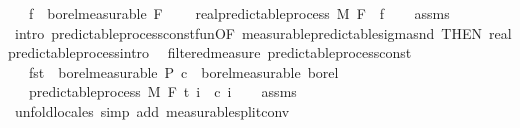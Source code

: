 \begin{isabellebody}
\ \ \ {\isachardoublequoteopen}f\ {\isasymin}\ borel{\isacharunderscore}{\kern0pt}measurable\ {\isacharparenleft}{\kern0pt}F\ {}{\isacharparenright}{\kern0pt}{\isachardoublequoteclose}\isanewline
\ \ \ {\isachardoublequoteopen}real{\isacharunderscore}{\kern0pt}predictable{\isacharunderscore}{\kern0pt}process\ M\ F\ {\isacharparenleft}{\kern0pt}{\isasymlambda}{\isacharunderscore}{\kern0pt}{\isachardot}{\kern0pt}\ f{\isacharparenright}{\kern0pt}{\isachardoublequoteclose}\isanewline
%
\isadelimproof
\ \ %
\endisadelimproof
%
\isatagproof
{}\isamarkupfalse%
\ assms\ \isamarkupfalse%
\ {\isacharparenleft}{\kern0pt}intro\ predictable{\isacharunderscore}{\kern0pt}process{\isacharunderscore}{\kern0pt}const{\isacharunderscore}{\kern0pt}fun{\isacharbrackleft}{\kern0pt}OF\ measurable{\isacharunderscore}{\kern0pt}predictable{\isacharunderscore}{\kern0pt}sigma{\isacharunderscore}{\kern0pt}snd{\isacharcomma}{\kern0pt}\ THEN\ real{\isacharunderscore}{\kern0pt}predictable{\isacharunderscore}{\kern0pt}process{\isachardot}{\kern0pt}intro{\isacharbrackright}{\kern0pt}{\isacharparenright}{\kern0pt}%
\endisatagproof
{\isafoldproof}%
%
\isadelimproof
\isanewline
%
\endisadelimproof
\isanewline
{}\isamarkupfalse%
\ {\isacharparenleft}{\kern0pt}\ filtered{\isacharunderscore}{\kern0pt}measure{\isacharparenright}{\kern0pt}\ predictable{\isacharunderscore}{\kern0pt}process{\isacharunderscore}{\kern0pt}const{\isacharcolon}{\kern0pt}\isanewline
\ \ \ {\isachardoublequoteopen}fst\ {\isasymin}\ borel{\isacharunderscore}{\kern0pt}measurable\ {\isasymSigma}\isactrlsub P{\isachardoublequoteclose}\ {\isachardoublequoteopen}c\ {\isasymin}\ borel{\isacharunderscore}{\kern0pt}measurable\ borel{\isachardoublequoteclose}\isanewline
\ \ \ {\isachardoublequoteopen}predictable{\isacharunderscore}{\kern0pt}process\ M\ F\ t\ {\isacharparenleft}{\kern0pt}{\isasymlambda}i\ {\isacharunderscore}{\kern0pt}{\isachardot}{\kern0pt}\ c\ i{\isacharparenright}{\kern0pt}{\isachardoublequoteclose}\isanewline
%
\isadelimproof
\ \ %
\endisadelimproof
%
\isatagproof
{}\isamarkupfalse%
\ assms\ \isamarkupfalse%
\ {\isacharparenleft}{\kern0pt}unfold{\isacharunderscore}{\kern0pt}locales{\isacharparenright}{\kern0pt}\ {\isacharparenleft}{\kern0pt}simp\ add{\isacharcolon}{\kern0pt}\ measurable{\isacharunderscore}{\kern0pt}split{\isacharunderscore}{\kern0pt}conv{\isacharparenright}{\kern0pt}%
\endisatagproof
{\isafoldproof}%

\end{isabellebody}
